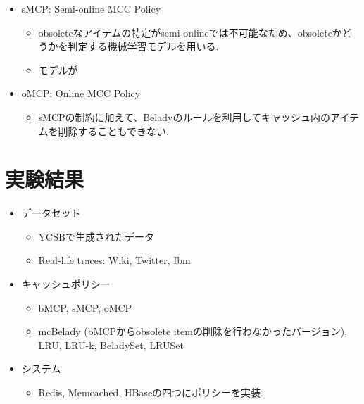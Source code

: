 \documentclass[dvipdfmx,uplatex]{jsarticle}
\theoremstyle{remark}
\newenvironment{method}[1]{
    \begin{tcolorbox}[
        colframe=green!50!black,
        colback=green!50!black!10!white,
        colbacktitle=green!50!black!40!white,
        coltitle=black,
        fonttitle=\bfseries,
        title={#1}
    ]
}{
    \end{tcolorbox}
}
\newenvironment{experiment}[1]{
    \begin{tcolorbox}[
        colframe=violet,
        colback=violet!10!white,
        colbacktitle=violet!40!white,
        coltitle=black,
        fonttitle=\bfseries,
        title={#1}
    ]
}{
    \end{tcolorbox}
}
\begin{document}
\begin{method}{Online MCC Policy}
\begin{itemize}
    \item sMCP: Semi-online MCC Policy
    \begin{itemize}
        \item obsoleteなアイテムの特定がsemi-onlineでは不可能なため、obsoleteかどうかを判定する機械学習モデルを用いる. 
        \item モデルが
    \end{itemize}
    \item oMCP: Online MCC Policy
    \begin{itemize}
        \item sMCPの制約に加えて、Beladyのルールを利用してキャッシュ内のアイテムを削除することもできない.
    \end{itemize}
\end{itemize}
\end{method}

\section{実験結果}
\begin{experiment}{実験手法}
\begin{itemize}
    \item データセット
    \begin{itemize}
        \item YCSBで生成されたデータ
        \item Real-life traces: Wiki, Twitter, Ibm
    \end{itemize}
    \item キャッシュポリシー
    \begin{itemize}
        \item bMCP, sMCP, oMCP
        \item mcBelady (bMCPからobsolete itemの削除を行わなかったバージョン), LRU, LRU-k, BeladySet, LRUSet
    \end{itemize}
    \item システム
    \begin{itemize}
        \item Redis, Memcached, HBaseの四つにポリシーを実装.
    \end{itemize}
\end{itemize}
\end{experiment}
\end{document}
